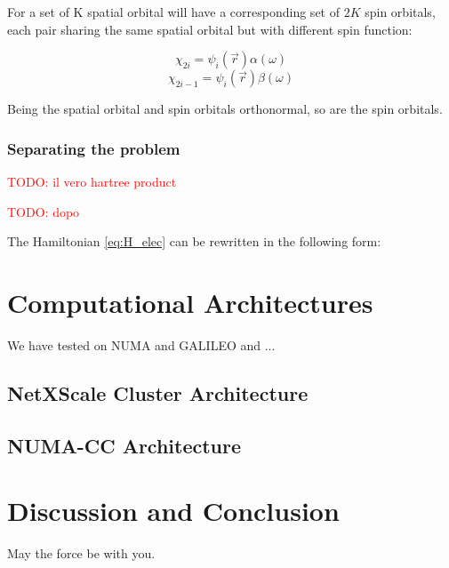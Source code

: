 \documentclass[a4paper,12pt]{article}
\newcommand\mynotes[1]{\begin{flushright}\textcolor{red}{TODO: #1}\end{flushright}}
\begin{document}
For a set of K spatial orbital will have a corresponding set of $2K$ spin orbitals, each pair sharing the same spatial orbital but with different spin function:

\begin{equation}
	\chi_{2i} = \psi_i(\vec{r}) \alpha(\omega)
\end{equation}
\begin{equation}
	\chi_{2i-1} = \psi_i(\vec{r}) \beta(\omega)
\end{equation}

Being the spatial orbital and spin orbitals orthonormal, so are the spin orbitals.

\subsubsection{Separating the problem}
\mynotes{il vero hartree product}

\mynotes{dopo}
The Hamiltonian \eqref{eq:H_elec} can be rewritten in the following form:








\section{Computational Architectures} \label{comparch:sec}


We have tested on NUMA and GALILEO and ...


\subsection{NetXScale Cluster Architecture}\label{galileoarch:sec}
\subsection{NUMA-CC Architecture}\label{numaarch:sec}


\section{Discussion and Conclusion}

May the force be with you.

\end{document}
